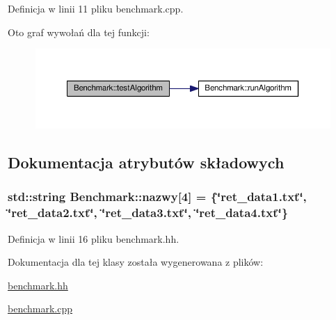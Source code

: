 Definicja w linii 11 pliku benchmark.\-cpp.



Oto graf wywołań dla tej funkcji\-:\nopagebreak
\begin{figure}[H]
\begin{center}
\leavevmode
\includegraphics[width=350pt]{class_benchmark_a900bc0d26c2ed6aa45afe4d5b295ccd1_cgraph}
\end{center}
\end{figure}




\subsection{Dokumentacja atrybutów składowych}
\hypertarget{class_benchmark_aee0beda65009e7334d34c5957f78c49a}{
\subsubsection[{nazwy}]{\setlength{\rightskip}{0pt plus 5cm}std\-::string Benchmark\-::nazwy\mbox{[}4\mbox{]} = \{\char`\"{}ret\-\_\-data1.\-txt\char`\"{}, \char`\"{}ret\-\_\-data2.\-txt\char`\"{}, \char`\"{}ret\-\_\-data3.\-txt\char`\"{}, \char`\"{}ret\-\_\-data4.\-txt\char`\"{}\}\hspace{0.3cm}{\ttfamily [private]}}}\label{class_benchmark_aee0beda65009e7334d34c5957f78c49a}


Definicja w linii 16 pliku benchmark.\-hh.



Dokumentacja dla tej klasy została wygenerowana z plików\-:\begin{DoxyCompactItemize}
\item 
\hyperlink{benchmark_8hh}{benchmark.\-hh}\item 
\hyperlink{benchmark_8cpp}{benchmark.\-cpp}\end{DoxyCompactItemize}

